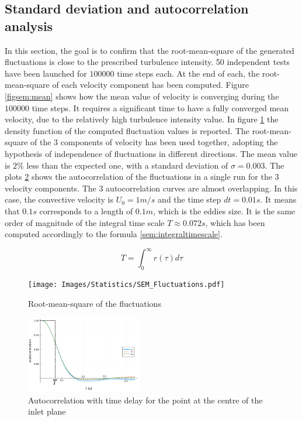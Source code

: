 \documentclass{juliacon}
\begin{document}
\subsection{Standard deviation and autocorrelation analysis}
In this section, the goal is to confirm that the root-mean-square of the generated fluctuations is close to the prescribed turbulence intensity. 50 independent tests have been launched for $\num{100000}$ time steps each. At the end of each, the root-mean-square of each velocity component has been computed. 
Figure \ref{figsem:mean} shows how the mean value of velocity is converging during the $\num{100000}$ time steps. It requires a significant time to have a fully converged mean velocity, due to the relatively high turbulence intensity value. In figure \ref{figsem:fluct} the density function of the computed fluctuation values is reported. The root-mean-square of the 3 components of velocity has been used together, adopting the hypothesis of independence of fluctuations in different directions. The mean value is $2\%$ less than the expected one, with a standard deviation of $\sigma=0.003$. 
The plots \ref{figsem:autocorr} shows the autocorrelation of the fluctuations in a single run for the 3 velocity components. The 3 autocorrelation curves are almost overlapping. In this case, the convective velocity is $U_0 = 1m/s$ and the time step $dt=0.01s$. It means that $0.1s$ corresponds to a length of $0.1m$, which is the eddies size. It is the same order of magnitude of the integral time scale $T\approx 0.072s$, which has been computed accordingly to the formula \ref{sem:integraltimescale}.

\begin{equation}
T = \int_0^\infty r(\tau)d\tau
    \label{sem:integraltimescale}
\end{equation}



\begin{figure}[h]
     \centering
     \centerline{\texttt{[image: Images/Statistics/SEM\_Fluctuations.pdf]}}
         \caption{Root-mean-square of the fluctuations}          
         \label{figsem:fluct}
\end{figure}


\begin{figure}[h]
     \centering
         \includegraphics[width=0.45\textwidth]{Images/Statistics/autocorr.png}
         \caption{Autocorrelation with time delay for the point at the centre of the inlet plane}
            \label{figsem:autocorr}
\end{figure}
\end{document}
